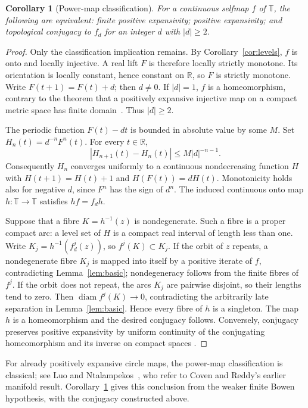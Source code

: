 \documentclass[11pt]{article}
\newtheorem{corollary}[theorem]{Corollary}
\newcommand{\T}{\mathbb T}
\newcommand{\diam}{\operatorname{diam}}
\begin{document}
\begin{corollary}[Power-map classification]\label{cor:classification}
For a continuous selfmap $f$ of $\T$, the following are equivalent:
finite positive expansivity; positive expansivity; and topological conjugacy
to $f_d$ for an integer $d$ with $|d|\ge2$.
\end{corollary}
\begin{proof}
Only the classification implication remains. By Corollary~\ref{cor:levels},
$f$ is onto and locally injective. A real lift $F$ is therefore locally
strictly monotone. Its orientation is locally constant, hence constant on
$\mathbb R$, so $F$ is strictly monotone. Write $F(t+1)=F(t)+d$; then
$d\ne0$. If $|d|=1$, $f$ is a homeomorphism, contrary to the theorem that
a positively expansive injective map on a compact metric space has finite
domain~\cite[Theorem, pp.~304--305]{CK}. Thus $|d|\ge2$.

The periodic function $F(t)-dt$ is bounded in absolute value by some $M$.
Set $H_n(t)=d^{-n}F^n(t)$. For every $t\in\mathbb R$,
\[
 |H_{n+1}(t)-H_n(t)|\le M|d|^{-n-1}.
\]
Consequently $H_n$ converges uniformly to a continuous nondecreasing
function $H$ with $H(t+1)=H(t)+1$ and $H(F(t))=dH(t)$. Monotonicity holds
also for negative $d$, since $F^n$ has the sign of $d^n$.
The induced continuous onto map $h:\T\to\T$ satisfies $hf=f_dh$.

Suppose that a fibre $K=h^{-1}(z)$ is nondegenerate. Such a fibre is a
proper compact arc: a level set of $H$ is a compact real interval of length
less than one. Write $K_j=h^{-1}(f_d^j(z))$, so $f^j(K)\subset K_j$.
If the orbit of $z$ repeats, a nondegenerate fibre $K_j$ is mapped into
itself by a positive iterate of $f$, contradicting Lemma~\ref{lem:basic};
nondegeneracy follows from the finite fibres of $f^j$. If the orbit does
not repeat, the arcs $K_j$ are pairwise disjoint, so their lengths tend to
zero. Then $\diam f^j(K)\to0$, contradicting the arbitrarily late
separation in Lemma~\ref{lem:basic}. Hence every fibre of $h$ is a singleton.
The map $h$ is a homeomorphism and the desired conjugacy follows.
Conversely, conjugacy preserves positive expansivity by uniform continuity
of the conjugating homeomorphism and its inverse on compact spaces
\cite[Proposition 2.4]{GGO}.
\end{proof}

For already positively expansive circle maps, the power-map classification is classical; see Luo and Ntalampekos~\cite[Section 3.4, property (E2), p.~3092]{LN}, who refer to Coven and Reddy's earlier manifold result. Corollary~\ref{cor:classification} gives this conclusion from the weaker finite Bowen hypothesis, with the conjugacy constructed above.
\end{document}
